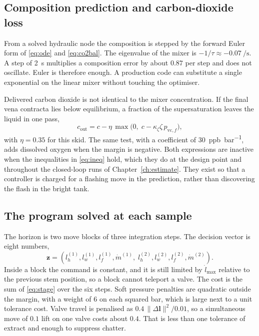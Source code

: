 \subsection{Composition prediction and carbon-dioxide loss}

From a solved hydraulic node the composition is stepped by the forward Euler form of \eqref{eq:ode} and \eqref{eq:co2bal}. The eigenvalue of the mixer is $-1/\tau \approx \SI{-0.07}{\per\second}$. A step of \SI{2}{\second} multiplies a composition error by about $0.87$ per step and does not oscillate. Euler is therefore enough. A production code can substitute a single exponential on the linear mixer without touching the optimiser.

Delivered carbon dioxide is not identical to the mixer concentration. If the final vena contracta lies below equilibrium, a fraction of the supersaturation leaves the liquid in one pass,
\begin{equation}
\label{eq:strip}
c_{\mathrm{out}}
=
c - \eta\,\max\!\big(0,\; c - \kappa_{\zeta}\zeta\,p_{\mathrm{vc},f}\big),
\end{equation}
with $\eta = 0.35$ for this skid. The same test, with a coefficient of \SI{30}{ppb\per\bar}, adds dissolved oxygen when the margin is negative. Both expressions are inactive when the inequalities in \eqref{eq:ineq} hold, which they do at the design point and throughout the closed-loop runs of Chapter~\ref{ch:estimate}. They exist so that a controller is charged for a flashing move in the prediction, rather than discovering the flash in the bright tank.

\subsection{The program solved at each sample}

The horizon is two move blocks of three integration steps. The decision vector is eight numbers,
\begin{equation}
\mathbf{z} = (l_h^{(1)}, l_w^{(1)}, l_f^{(1)}, \dot m^{(1)},\;
l_h^{(2)}, l_w^{(2)}, l_f^{(2)}, \dot m^{(2)}).
\end{equation}
Inside a block the command is constant, and it is still limited by $\dot l_{\max}$ relative to the previous stem position, so a block cannot teleport a valve. The cost is the sum of \eqref{eq:stage} over the six steps. Soft pressure penalties are quadratic outside the margin, with a weight of $6$ on each squared bar, which is large next to a unit tolerance cost. Valve travel is penalised as $0.4\,\|\Delta\mathbf{l}\|^{2}/0.01$, so a simultaneous move of $0.1$ lift on one valve costs about $0.4$. That is less than one tolerance of extract and enough to suppress chatter.

